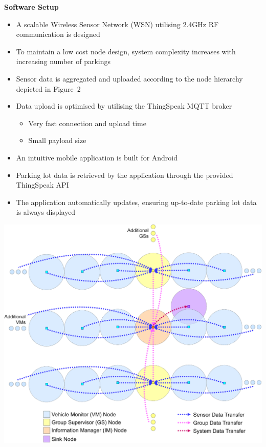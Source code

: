 \documentclass[landscape,a1paper,fontscale=0.47]{baposter} %
\newcommand{\compresslist}{ %
\setlength{\itemsep}{1pt}
\setlength{\parskip}{0pt}
\setlength{\parsep}{0pt}
}
\begin{document}
\begin{poster}
{\begin{multicols}{2}
		\textbf{Software Setup}
			\begin{itemize}[leftmargin=13pt]\compresslist
				\item A scalable Wireless Sensor Network (WSN) utilising 2.4GHz RF communication is designed
				\item To maintain a low cost node design, system complexity increases with increasing number of parkings
				\item Sensor data is aggregated and uploaded according to the node hierarchy depicted in Figure~2
				\item Data upload is optimised by utilising the ThingSpeak MQTT broker
					\begin{itemize}[leftmargin=13pt]\compresslist
						\item Very fast connection and upload time
						\item Small payload size
					\end{itemize}
				\item An intuitive mobile application is built for Android
				\item Parking lot data is retrieved by the application through the provided ThingSpeak API
				\item The application automatically updates, ensuring up-to-date parking lot data is always displayed 
			\end{itemize}
		
		\begin{center}
			\includegraphics[width=0.9\columnwidth]{mesh-cropped}
		\end{center}
	

\end{multicols}}
\end{poster}
\end{document}
